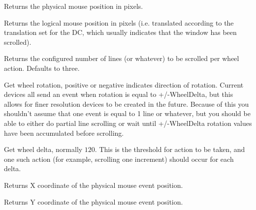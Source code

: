 Returns the physical mouse position in pixels.


\label{wxmouseeventgetlogicalposition}


Returns the logical mouse position in pixels (i.e. translated according to the
translation set for the DC, which usually indicates that the window has been scrolled).



\label{wxmouseeventgetlinesperaction}


Returns the configured number of lines (or whatever) to be scrolled per
wheel action.  Defaults to three.


\label{wxmouseeventgetwheelrotation}


Get wheel rotation, positive or negative indicates direction of
rotation.  Current devices all send an event when rotation is equal to
+/-WheelDelta, but this allows for finer resolution devices to be
created in the future.  Because of this you shouldn't assume that one
event is equal to 1 line or whatever, but you should be able to either
do partial line scrolling or wait until +/-WheelDelta rotation values
have been accumulated before scrolling.


\label{wxmouseeventgetwheeldelta}


Get wheel delta, normally $120$.  This is the threshold for action to be
taken, and one such action (for example, scrolling one increment)
should occur for each delta.


\label{wxmouseeventgetx}


Returns X coordinate of the physical mouse event position.


\label{wxmouseeventgety}


Returns Y coordinate of the physical mouse event position.


\label{wxmouseeventisbutton}

